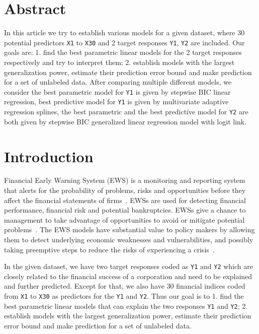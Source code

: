 \documentclass[11pt,oneside,a4paper]{article}
\title{\hmwkTitle}
\author{\hmwkAuthorName}
\date{}
\newcommand{\m}[1]{\texttt{{#1}}}
\begin{document}
\maketitle
\clearpage

\section{Abstract}
In this article we try to establish various models for a given dataset, where 30 potential predictors \m{X1} to \m{X30} and 2 target responses \m{Y1}, \m{Y2} are included. Our goals are: 1. find the best parametric linear models for the 2 target responses respectively and try to interpret them; 2. establish models with the largest generalization power, estimate their prediction error bound and make prediction for a set of unlabeled data. After comparing multiple different models, we consider the best parametric model for \m{Y1} is given by stepwise BIC linear regression, best predictive model for \m{Y1} is given by multivariate adaptive regression splines, the best parametric and the best predictive model for \m{Y2} are both given by stepwise BIC generalized linear regression model with logit link.

\section{Introduction}
Financial Early Warning System (EWS) is a monitoring and reporting system that alerts for the probability of problems, risks and opportunities before they affect the financial statements of firms~\cite{li2014feature}. EWSs are used for detecting financial performance, financial risk and potential bankruptcies. EWSs give a chance to management to take advantage of opportunities to avoid or mitigate potential problems~\cite{koyuncugil2012financial}. The EWS models have substantial value to policy makers by allowing them to detect underlying economic weaknesses and vulnerabilities, and possibly taking preemptive steps to reduce the risks of experiencing a crisis~\cite{bussiere2006towards}. 

In the given dataset, we have two target responses coded as \m{Y1} and \m{Y2} which are closely related to the financial success of a corporation and need to be explained and further predicted. Except for that, we also have 30 financial indices coded from \m{X1} to \m{X30} as predictors for the \m{Y1} and \m{Y2}.  Thus our goal is to 1. find the best parametric linear models that can explain the two responses \m{Y1} and \m{Y2}; 2. establish models with the largest generalization power, estimate their prediction error bound and make prediction for a set of unlabeled data.
\end{document}
